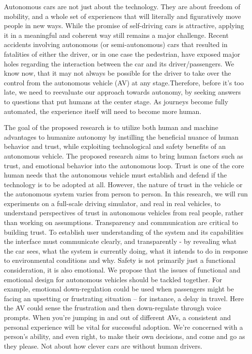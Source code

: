 

Autonomous cars are not just about the technology. They are about freedom of mobility, and a whole set of experiences that will literally and figuratively move people in new ways.
While the promise of self-driving cars is attractive, applying it in a meaningful and coherent way still remains a major challenge. Recent accidents involving autonomous (or semi-autonomous) cars that resulted in fatalities of either the driver, or in one case the pedestrian, have exposed major holes regarding the interaction between the car and its driver/passengers. We know now, that it may not always be possible for the driver to take over the control from the autonomous vehicle (AV) at any stage.Therefore, before it’s too late, we need to reevaluate our approach towards autonomy, by seeking answers to questions that put humans at the center stage. As journeys become fully automated, the experience itself will need to become more human. 

The goal of the proposed research is to utilize both human and machine advantages to humanize autonomy  by instilling the beneficial nuance of human behavior and trust, while exploiting technological and safety benefits of an autonomous vehicle. The proposed research aims to bring human factors such as trust, and emotional behavior into the autonomous loop.   Trust is one of the core human needs that the autonomous vehicle must establish and defend if the technology is to be adopted at all. However, the nature of trust in the vehicle or the autonomous system varies from person to person. In this research, we will run experiments on a full-scale driving simulator, and real in real vehicles, to understand perspectives of trust in autonomous vehicles from real people, rather than working on assumptions. Transparency and communication are critical to building trust. To establish user understanding of the system and its capabilities the interface must communicate clearly, and transparently - by revealing what the car sees, what the system is currently doing, what it intends to do in response to environmental conditions and why. 
Safety is not primarily just a functional consideration, it is also emotional. We propose that the issues of functional and emotional design for autonomous vehicles should be tackled together.
For example, emotional down-regulation could be used when passengers might be facing an upsetting or frustrating situation – for instance, a delay in travel. Here the AV could sense the frustration and then down-regulate through voice prompts. When you’re jumping in and out of different AVs, a consistent and personal experience will be vital for successful adoption.
 We’re concerned with a person’s ability, and even right, to make their own decisions, and come and go as they please. Not about how clever cars are without human drivers. 

